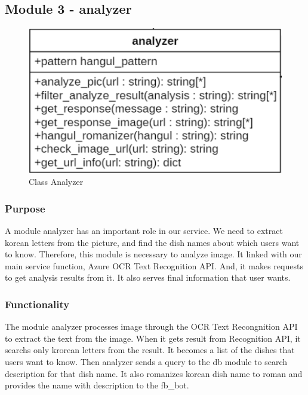\FloatBarrier


\subsection{Module 3 - analyzer}



\begin{figure}[htbp]
\centerline{\includegraphics[width=\linewidth]{./pictures/class_analyzer}}
\caption{Class Analyzer}
\label{fig:class_analyzer}
\end{figure}
\FloatBarrier

\subsubsection {Purpose}

A module analyzer has an important role in our service. We need to extract korean letters from the picture, and find the dish names about which users want to know. Therefore, this module is necessary to analyze image. It linked with our main service function, Azure OCR Text Recognition API. And, it makes requests to get analysis results from it. It also serves final information that user wants. \newline

\subsubsection {Functionality}

The module analyzer processes image through the OCR Text Recongnition API to extract the text from the image. When it gets result from Recognition API, it searchs only krorean letters from the result. It becomes a list of the dishes that users want to know. Then analyzer sends a query to the db module to search description for that dish name. It also romanizes korean dish name to roman and provides the name with description to the fb\_bot. \newline


